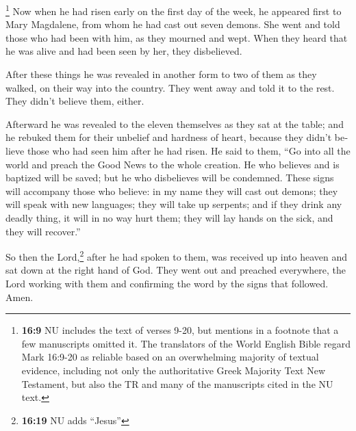 \begin{paracol}{2}
\begin{otherlanguage}{english}
 \footnote{\textbf{16:9} NU includes the text of verses
  9-20, but mentions in a footnote that a few manuscripts omitted it.
  The translators of the World English Bible regard Mark 16:9-20 as
  reliable based on an overwhelming majority of textual evidence,
  including not only the authoritative Greek Majority Text New
  Testament, but also the TR and many of the manuscripts cited in the NU
  text.} Now when he had risen early on the first day of the week, he
appeared first to Mary Magdalene, from whom he had cast out seven
demons.  She went and told those who had been with him,
as they mourned and wept.  When they heard that he was
alive and had been seen by her, they disbelieved.

 After these things he was revealed in another form to
two of them as they walked, on their way into the country.
 They went away and told it to the rest. They didn't
believe them, either.

 Afterward he was revealed to the eleven themselves as
they sat at the table; and he rebuked them for their unbelief and
hardness of heart, because they didn't believe those who had seen him
after he had risen.  He said to them, ``Go into all the
world and preach the Good News to the whole creation.  He
who believes and is baptized will be saved; but he who disbelieves will
be condemned.  These signs will accompany those who
believe: in my name they will cast out demons; they will speak with new
languages;  they will take up serpents; and if they drink
any deadly thing, it will in no way hurt them; they will lay hands on
the sick, and they will recover.''

 So then the Lord,\footnote{\textbf{16:19} NU adds
  ``Jesus''} after he had spoken to them, was received up into heaven
and sat down at the right hand of God.  They went out and
preached everywhere, the Lord working with them and confirming the word
by the signs that followed. Amen. \end{otherlanguage}
\end{paracol}
